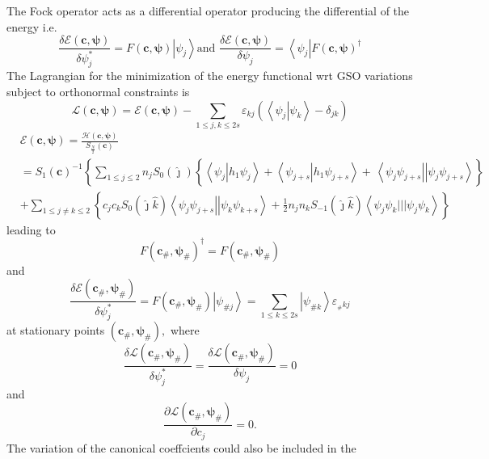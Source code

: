 \documentclass[aps,preprint]{revtex4}%
\begin{document}
The Fock operator acts as a differential operator producing the differential
of the energy i.e.
\[
\frac{\delta\mathcal{E}\left(  \mathbf{c,\psi}\right)  }{\delta\psi_{j}^{\ast
}}=F\left(  \mathbf{c,\psi}\right)  \left\vert \psi_{j}\right\rangle \text{
and }\frac{\delta\mathcal{E}\left(  \mathbf{c,\psi}\right)  }{\delta\psi_{j}%
}=\left\langle \psi_{j}\right\vert F\left(  \mathbf{c,\psi}\right)  ^{\dagger}%
\]
The Lagrangian for the minimization of the energy functional wrt GSO
variations subject to orthonormal constraints is
\[
\mathcal{L}\left(  \mathbf{c,\psi}\right)  =\mathcal{E}\left(  \mathbf{c,\psi
}\right)  -\sum_{1\leq j,k\leq2s}\varepsilon_{kj}\left(  \left\langle \left.
\psi_{j}\right\vert \psi_{k}\right\rangle -\delta_{jk}\right)
\]%
\begin{align*}
&  \mathcal{E}\left(  \mathbf{c,\psi}\right)  =\frac{\mathcal{H}\left(
\mathbf{c,\psi}\right)  }{S_{\frac{N}{2}}\left(  \mathbf{c}\right)  }\\
&  =S_{1}\left(  \mathbf{c}\right)  ^{-1}\left\{  \sum_{1\leq j\leq2}%
n_{j}S_{0}\left(  \hat{\jmath}\right)  \left\{  \overset{}{\left\langle
\psi_{j}\left\vert h_{1}\psi_{j}\right.  \right\rangle +\left\langle
\psi_{j+s}\left\vert h_{1}\psi_{j+s}\right.  \right\rangle }+\,\left\langle
\psi_{j}\psi_{j+s}\right\vert \left\vert \psi_{j}\psi_{j+s}\right\rangle
\right\}  \right. \\
&  +\sum_{1\leq j\neq k\leq2}\left\{  c_{j}c_{k}S_{0}\left(  \hat{\jmath}%
\hat{k}\right)  \left\langle \psi_{j}\psi_{j+s}\right\vert \left\vert \psi
_{k}\psi_{k+s}\right\rangle +\frac{1}{2}\overset{}{n_{j}n_{k}S_{-1}\left(
\hat{\jmath}\hat{k}\right)  \left\langle \psi_{j}\psi_{k}|||\psi_{j}\psi
_{k}\right\rangle }\right\}
\end{align*}
leading to
\[
F\left(  \mathbf{c}_{\#}\mathbf{,\psi}_{\#}\right)  ^{\dagger}=F\left(
\mathbf{c}_{\#}\mathbf{,\psi}_{\#}\right)
\]
and
\[
\frac{\delta\mathcal{E}\left(  \mathbf{c}_{\#}\mathbf{,\psi}_{\#}\right)
}{\delta\psi_{j}^{\ast}}=F\left(  \mathbf{c}_{\#}\mathbf{,\psi}_{\#}\right)
\left\vert \psi_{\#j}\right\rangle =\sum_{1\leq k\leq2s}\left\vert \psi
_{\#k}\right\rangle \varepsilon_{_{\#}kj}%
\]
at stationary points $\left(  \mathbf{c}_{\#}\mathbf{,\psi}_{\#}\right)  ,$
where
\[
\frac{\delta\mathcal{L}\left(  \mathbf{c}_{\#}\mathbf{,\psi}_{\#}\right)
}{\delta\psi_{j}^{\ast}}=\frac{\delta\mathcal{L}\left(  \mathbf{c}%
_{\#}\mathbf{,\psi}_{\#}\right)  }{\delta\psi_{j}}=0
\]
and
\[
\frac{\partial\mathcal{L}\left(  \mathbf{c}_{\#}\mathbf{,\psi}_{\#}\right)
}{\partial c_{j}}=0.
\]
The variation of the canonical coeffcients could also be included in the
\end{document}
